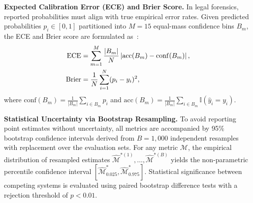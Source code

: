 \noindent\textbf{Expected Calibration Error (ECE) and Brier Score.} In legal forensics, reported probabilities must align with true empirical error rates. Given predicted probabilities $p_i \in [0, 1]$ partitioned into $M=15$ equal-mass confidence bins $B_m$, the ECE and Brier score are formulated as~\cite{guo2017calibration}:
\begin{align}
\mathrm{ECE} &= \sum_{m=1}^{M} \frac{|B_m|}{N} \left| \mathrm{acc}(B_m) - \mathrm{conf}(B_m) \right|, \label{eq:ece} \\
\mathrm{Brier} &= \frac{1}{N} \sum_{i=1}^N (p_i - y_i)^2, \notag
\end{align}
where $\mathrm{conf}(B_m) = \frac{1}{|B_m|}\sum_{i \in B_m} p_i$ and $\mathrm{acc}(B_m) = \frac{1}{|B_m|}\sum_{i \in B_m} \mathbb{I}(\hat{y}_i = y_i)$.

\noindent\textbf{Statistical Uncertainty via Bootstrap Resampling.} To avoid reporting point estimates without uncertainty, all metrics are accompanied by 95\% bootstrap confidence intervals derived from $B=1,000$ independent resamples with replacement over the evaluation sets. For any metric $\mathcal{M}$, the empirical distribution of resampled estimates $\hat{\mathcal{M}}^{*(1)}, \dots, \hat{\mathcal{M}}^{*(B)}$ yields the non-parametric percentile confidence interval $[\hat{\mathcal{M}}_{0.025}^*, \hat{\mathcal{M}}_{0.975}^*]$. Statistical significance between competing systems is evaluated using paired bootstrap difference tests with a rejection threshold of $p < 0.01$.
